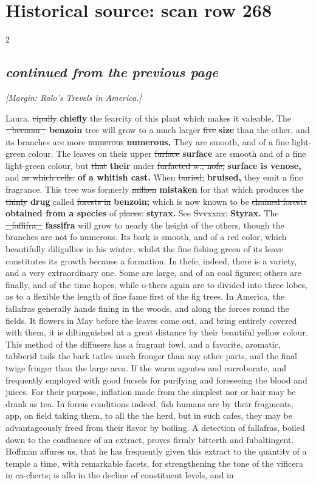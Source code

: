 \documentclass[10pt]{article}
\begin{document}
\section*{Historical source: scan row 268}
\begin{multicols}{2}
\subsection*{\textit{continued from the previous page}}
{\small\itshape [Margin: \emph{Ralo’s} \emph{Trevels in America.}]}\par
Laura. \sout{cipally} \textbf{chiefly} the fearcity of this plant which makes it valeable. The \sout{\_becaom\_} \textbf{benzoin} tree will grow to a much larger \sout{five} \textbf{size} than the other, and its branches are more \sout{numerous} \textbf{numerous.} They are smooth, and of a fine light-green colour. The leaves on their upper \sout{furface} \textbf{surface} are smooth and of a fine light-green colour, but \sout{that} \textbf{their} under \sout{furfacted w., nofe,} \textbf{surface is venose,} and \sout{as which cells.} \textbf{of a whitish cast.} When \sout{buried,} \textbf{bruised,} they emit a fine fragrance. This tree was formerly \sout{milken} \textbf{mistaken} for that which produces the \sout{thinly} \textbf{drug} called \sout{forests in} \textbf{benzoin;} which is now known to be \sout{chained forests} \textbf{obtained from a species} of \sout{places.} \textbf{styrax.} See \sout{Svvxxax.} \textbf{Styrax.} The \sout{\_faffifra\_} \textbf{fassifra} will grow to nearly the height of the others, though the branches are not fo numerous. Its bark is smooth, and of a red color, which beautifully diligullies in his winter, whilst the fine fishing green of its leave constitutes its growth because a formation. In thefe, indeed, there is a variety, and a very extraordinary one. Some are large, and of an coal figures; others are finally, and of the time hopes, while o-thers again are to divided into three lobes, as to a flexible the length of fine fame first of the fig trees. In America, the fallafras generally hands fining in the woods, and along the forces round the fields. It flowers in May before the leaves come out, and bring entirely covered with them, it is diltinguished at a great distance by their beautiful yellow colour. This method of the diffusers has a fragrant fowl, and a favorite, aromatic, tabberid tails the bark tatles much fronger than any other parts, and the final twige fringer than the large area. If the warm agentes and corroborate, and frequently employed with good fucsels for purifying and foreseeing the blood and juices. For their purpose, inflation made from the simplest nor or hair may be drank as tea. In forms conditions indeed, fish humans are by their fragments, app, on field taking them, to all the the herd, but in such cafes, they may be advantageously freed from their flavor by boiling. A detection of fallafras, boiled down to the confluence of an extract, proves firmly bitterth and fubaltingent. Hoffman affures us, that he has frequently given this extract to the quantity of a temple a time, with remarkable facets, for strengthening the tone of the vificera in ca-cherts; is allo in the decline of constituent levels, and in 
\end{multicols}
\end{document}
